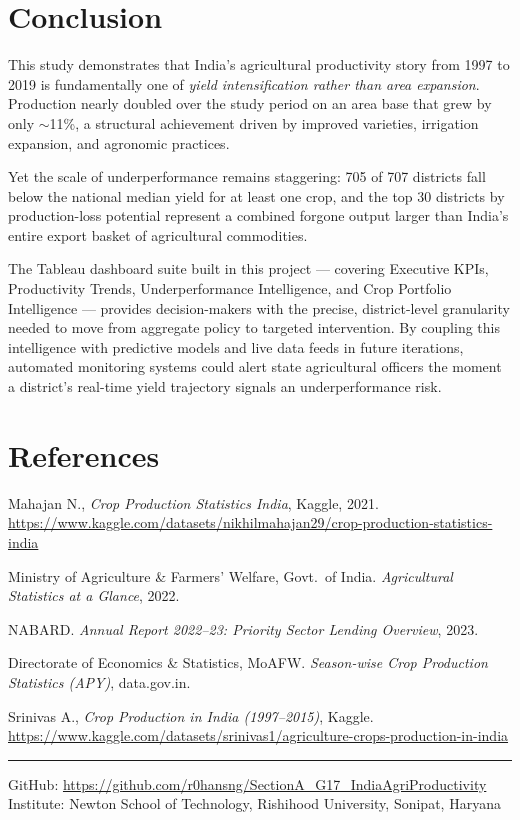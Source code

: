 \documentclass[10pt]{article}
\begin{document}
\section{Conclusion}

This study demonstrates that India's agricultural productivity story from
1997 to 2019 is fundamentally one of \textit{yield intensification rather than
area expansion}. Production nearly doubled over the study period on an area base
that grew by only $\sim$11\%, a structural achievement driven by improved
varieties, irrigation expansion, and agronomic practices.

Yet the scale of underperformance remains staggering: 705 of 707 districts fall
below the national median yield for at least one crop, and the top 30 districts
by production-loss potential represent a combined forgone output larger than
India's entire export basket of agricultural commodities.

The Tableau dashboard suite built in this project — covering Executive KPIs,
Productivity Trends, Underperformance Intelligence, and Crop Portfolio
Intelligence — provides decision-makers with the precise, district-level
granularity needed to move from aggregate policy to targeted intervention.
By coupling this intelligence with predictive models and live data feeds in
future iterations, automated monitoring systems could alert state agricultural
officers the moment a district's real-time yield trajectory signals an
underperformance risk.

\section*{References}
\begin{enumerate}[leftmargin=*, topsep=2pt, itemsep=2pt, label={[\arabic*]}]
  \item Mahajan N., \textit{Crop Production Statistics India}, Kaggle, 2021.
        \url{https://www.kaggle.com/datasets/nikhilmahajan29/crop-production-statistics-india}
  \item Ministry of Agriculture \& Farmers' Welfare, Govt.\ of India.
        \textit{Agricultural Statistics at a Glance}, 2022.
  \item NABARD. \textit{Annual Report 2022–23: Priority Sector Lending Overview}, 2023.
  \item Directorate of Economics \& Statistics, MoAFW.
        \textit{Season-wise Crop Production Statistics (APY)}, data.gov.in.
  \item Srinivas A., \textit{Crop Production in India (1997–2015)}, Kaggle.
        \url{https://www.kaggle.com/datasets/srinivas1/agriculture-crops-production-in-india}
\end{enumerate}

\vspace{6pt}
\noindent\rule{\columnwidth}{0.4pt}
\begin{center}
  \footnotesize
  GitHub: \url{https://github.com/r0hansng/SectionA_G17_IndiaAgriProductivity}\\
  Institute: Newton School of Technology, Rishihood University, Sonipat, Haryana
\end{center}
\end{document}
